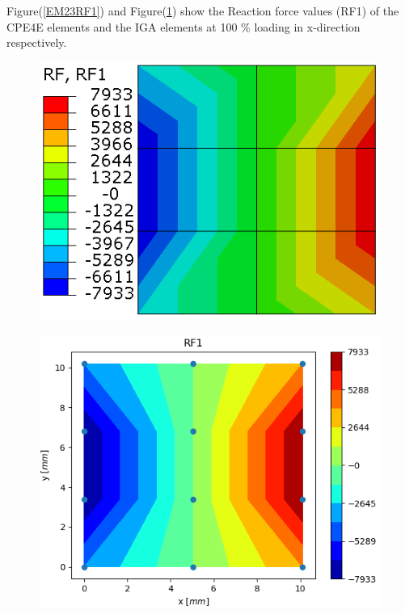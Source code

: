 \documentclass[11pt]{article}
\begin{document}
Figure(\ref{EM23RF1}) and Figure(\ref{EM23RF1_IGA}) show the Reaction force values (RF1) of the CPE4E elements and the IGA elements at 100 \% loading in x-direction respectively. \\
\begin{figure}[H]
	\centering
	\begin{minipage}{.5\textwidth}
		\centering
		\includegraphics[width=1\linewidth]{EM23RF1.png}
		\label{EM23RF1}
	\end{minipage}%
	\begin{minipage}{.5\textwidth}
		\centering
		\includegraphics[width=1\linewidth]{EM23RF1_IGA.png}
		\label{EM23RF1_IGA}
	\end{minipage}
\end{figure}
\end{document}
